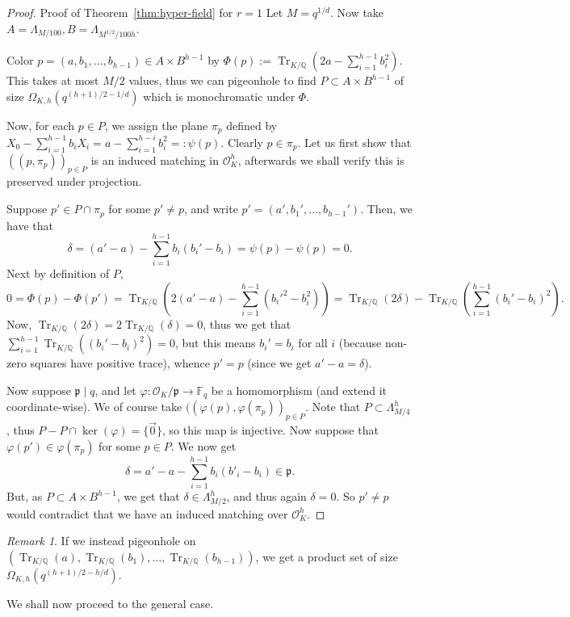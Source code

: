 \documentclass[11pt]{article}
\theoremstyle{plain}
\theoremstyle{remark}
\newtheorem{remark}[theorem]{Remark}
\newcommand{\F}{\mathbb F}
\newcommand{\Q}{\mathbb Q}
\newcommand{\OK}{\mathcal O_K}
\newcommand{\Tr}{\operatorname{Tr}_{K/\Q}}
\begin{document}
\begin{proof}{Proof of Theorem~\ref{thm:hyper-field} for $r=1$}
    Let $M = q^{1/d}$. Now take $ A = \Lambda_{M/100}, B = \Lambda_{M^{1/2}/100 h}$.

    Color $p=(a,b_1,\dots,b_{h-1})\in A\times B^{h-1}$ by $\Phi(p):=\Tr(2a-\sum_{i=1}^{h-1} b_i^2)$. This takes at most $M/2$ values, thus we can pigeonhole to find $P\subset A\times B^{h-1}$ of size $\Omega_{K,h}(q^{(h+1)/2-1/d})$ which is monochromatic under $\Phi$. 

    Now, for each $p\in P$, we assign the plane $\pi_p $ defined by $X_0 -\sum_{i=1}^{h-1} b_i X_i = a-\sum_{i=1}^{h-i}b_i^2=:\psi(p)$. Clearly $p\in \pi_p$. Let us first show that $((p,\pi_p))_{p\in P}$ is an induced matching in $\OK^h$, afterwards we shall verify this is preserved under projection.

    Suppose $p'\in P\cap \pi_p$ for some $p'\neq p$, and write $p' = (a',b_1',\dots,b_{h-1}')$. Then, we have that \[\delta = (a'-a)-\sum_{i=1}^{h-1}b_i(b_i'-b_i) = \psi(p)-\psi(p)=0.\]Next by definition of $P$, \[0=\Phi(p)-\Phi(p')=\Tr(2(a'-a) -\sum_{i=1}^{h-1}(b_i'^2-b_i^2)) = \Tr(2\delta)-\Tr(\sum_{i=1}^{h-1}(b_i'-b_i)^2) .\]Now, $\Tr(2\delta) = 2\Tr(\delta) =0$, thus we get that $\sum_{i=1}^{h-1}\Tr((b_i'-b_i)^2)=0$, but this means $b_i'=b_i$ for all $i$ (because non-zero squares have positive trace), whence $p'=p$ (since we get $a'-a= \delta$).  
    
    
    Now suppose $\mathfrak{p}\mid q$, and let $\varphi:\OK/\mathfrak{p}\to \F_q$ be a homomorphism (and extend it coordinate-wise). We of course take $((\varphi(p),\varphi(\pi_p))_{p\in P}$. Note that $P\subset \Lambda_{M/4}^h$, thus $P-P\cap \ker(\varphi) = \{\vec{0}\}$, so this map is injective. Now suppose that $\varphi(p')\in \varphi(\pi_p)$ for some $p\in P$. We now get 
    \[\delta = a'-a -\sum_{i=1}^{h-1}b_i(b'_i-b_i) \in \mathfrak{p}.\]But, as $P\subset A\times B^{h-1}$, we get that $\delta\in \Lambda_{M/2}^{h}$, and thus again $\delta=0$. So $p'\neq p$ would contradict that we have an induced matching over $\OK^h$.
\end{proof}
\begin{remark}
    If we instead pigeonhole on $(\Tr(a),\Tr(b_1),\dots,\Tr(b_{h-1}))$, we get a product set of size $\Omega_{K,h}(q^{(h+1)/2-h/d})$.
\end{remark}

We shall now proceed to the general case. 
\end{document}
